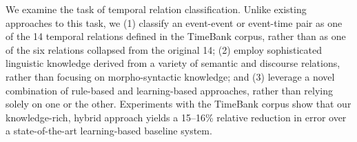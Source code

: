 We examine the task of temporal relation classification. Unlike existing approaches to this task, we (1) classify an event-event or event-time pair as
 one of the 14 temporal relations defined in the TimeBank corpus, rather than as
 one of the six relations collapsed from the original 14; (2) employ
 sophisticated linguistic knowledge derived from a variety of semantic and
 discourse relations, rather than focusing on morpho-syntactic knowledge; and
 (3) leverage a novel combination of rule-based and learning-based approaches,
 rather than relying solely on one or the other. Experiments with the TimeBank
 corpus show that our knowledge-rich, hybrid approach yields a 15--16\% relative
 reduction in error over a state-of-the-art learning-based baseline system.


